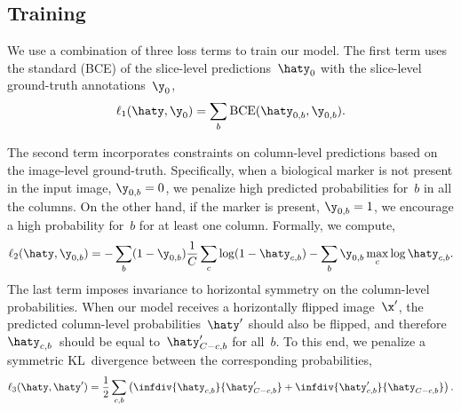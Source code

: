 

\subsection{Training}

We use a combination of three loss terms to train our model. The first term uses the standard  (BCE) of the slice-level predictions~$\haty_0$ with the slice-level ground-truth annotations~$\y_0$,
\begin{equation}
    \ell_1(\haty, \y_0) = \sum_{b} \textrm{BCE}(\haty_{0,b}, \y_{0,b}).
    \label{eq:l1}
\end{equation}

The second term incorporates constraints on column-level predictions based on the image-level ground-truth. Specifically, when a biological marker is not present in the input image, $\y_{0,b} = 0$, we penalize high predicted probabilities for~$b$ in all the columns. On the other hand, if the marker is present, $\y_{0,b}=1$, we encourage a high probability for~$b$ for at least one column. Formally, we compute,
\begin{equation}
    \ell_2(\haty, \y_{0,b}) = -\sum_b (1-\y_{0,b})\dfrac{1}{C}\sum_c \log (1-\haty_{c,b}) - \sum_b \y_{0,b}\max_c \log \haty_{c,b}.
    \label{eq:l2}
\end{equation}
The last term imposes invariance to horizontal symmetry on the column-level probabilities. When our model receives a horizontally flipped image~$\x'$, the predicted column-level probabilities~$\haty'$ should also be flipped, and therefore $\haty_{c,b}$~should be equal to~$\haty'_{C-c,b}$ for all~$b$. To this end, we penalize a symmetric KL~divergence between the corresponding probabilities,
\begin{equation}
    \ell_3(\haty, \haty') = \dfrac{1}{2}\sum_{c, b} 
        \left(
            \infdiv{\haty_{c, b}}{{\haty'_{C-c, b}}} +
            \infdiv{\haty'_{c, b}}{{\haty_{C-c, b}}}
        \right).
\end{equation}

